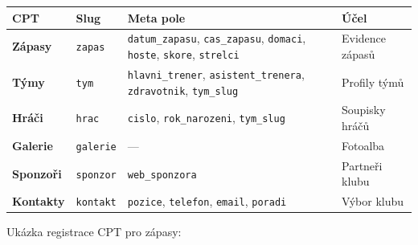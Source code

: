 {\def\LTcaptype{none} %
\begin{longtable}[]{@{}
  >{\raggedright\arraybackslash}p{}
  >{\raggedright\arraybackslash}p{}
  >{\raggedright\arraybackslash}p{}
  >{\raggedright\arraybackslash}p{}@{}}
\toprule\noalign{}
\begin{minipage}[b]{\linewidth}\raggedright
CPT
\end{minipage} & \begin{minipage}[b]{\linewidth}\raggedright
Slug
\end{minipage} & \begin{minipage}[b]{\linewidth}\raggedright
Meta pole
\end{minipage} & \begin{minipage}[b]{\linewidth}\raggedright
Účel
\end{minipage} \\
\midrule\noalign{}
\endhead
\bottomrule\noalign{}
\endlastfoot
\textbf{Zápasy} & \texttt{zapas} & \texttt{datum\_zapasu},
\texttt{cas\_zapasu}, \texttt{domaci}, \texttt{hoste}, \texttt{skore},
\texttt{strelci} & Evidence zápasů \\
\textbf{Týmy} & \texttt{tym} & \texttt{hlavni\_trener},
\texttt{asistent\_trenera}, \texttt{zdravotnik}, \texttt{tym\_slug} &
Profily týmů \\
\textbf{Hráči} & \texttt{hrac} & \texttt{cislo}, \texttt{rok\_narozeni},
\texttt{tym\_slug} & Soupisky hráčů \\
\textbf{Galerie} & \texttt{galerie} & --- & Fotoalba \\
\textbf{Sponzoři} & \texttt{sponzor} & \texttt{web\_sponzora} & Partneři
klubu \\
\textbf{Kontakty} & \texttt{kontakt} & \texttt{pozice},
\texttt{telefon}, \texttt{email}, \texttt{poradi} & Výbor klubu \\
\end{longtable}
}

Ukázka registrace CPT pro zápasy:


